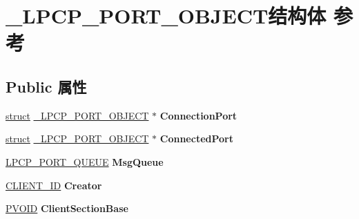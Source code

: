 \hypertarget{struct___l_p_c_p___p_o_r_t___o_b_j_e_c_t}{}\section{\+\_\+\+L\+P\+C\+P\+\_\+\+P\+O\+R\+T\+\_\+\+O\+B\+J\+E\+C\+T结构体 参考}
\label{struct___l_p_c_p___p_o_r_t___o_b_j_e_c_t}
\subsection*{Public 属性}
\begin{DoxyCompactItemize}
\item 
\mbox{\label{struct___l_p_c_p___p_o_r_t___o_b_j_e_c_t_a9c071fb75c954d7934bbe25a38b9adeb}} 
\hyperlink{interfacestruct}{struct} \hyperlink{struct___l_p_c_p___p_o_r_t___o_b_j_e_c_t}{\+\_\+\+L\+P\+C\+P\+\_\+\+P\+O\+R\+T\+\_\+\+O\+B\+J\+E\+CT} $\ast$ {\bfseries Connection\+Port}
\item 
\mbox{\label{struct___l_p_c_p___p_o_r_t___o_b_j_e_c_t_a8f69e28a2a5e9a2c05e49bdd19e1caa1}} 
\hyperlink{interfacestruct}{struct} \hyperlink{struct___l_p_c_p___p_o_r_t___o_b_j_e_c_t}{\+\_\+\+L\+P\+C\+P\+\_\+\+P\+O\+R\+T\+\_\+\+O\+B\+J\+E\+CT} $\ast$ {\bfseries Connected\+Port}
\item 
\mbox{\label{struct___l_p_c_p___p_o_r_t___o_b_j_e_c_t_a81d758e6e7a5a66f3d3fcc93381736c7}} 
\hyperlink{struct___l_p_c_p___p_o_r_t___q_u_e_u_e}{L\+P\+C\+P\+\_\+\+P\+O\+R\+T\+\_\+\+Q\+U\+E\+UE} {\bfseries Msg\+Queue}
\item 
\mbox{\label{struct___l_p_c_p___p_o_r_t___o_b_j_e_c_t_abfd036f3c3a8ad25d7e296b2c2e1a875}} 
\hyperlink{struct___c_l_i_e_n_t___i_d}{C\+L\+I\+E\+N\+T\+\_\+\+ID} {\bfseries Creator}
\item 
\mbox{\label{struct___l_p_c_p___p_o_r_t___o_b_j_e_c_t_a9d02e1c987c3aa3aeb070b47ba85b223}} 
\hyperlink{interfacevoid}{P\+V\+O\+ID} {\bfseries Client\+Section\+Base}
\item 
\mbox{\label{struct___l_p_c_p___p_o_r_t___o_b_j_e_c_t_ae9cc90a58a864ef94c4cfab354194ea8}} 

\end{DoxyCompactItemize}
